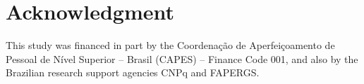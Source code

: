 \documentclass{article}
\begin{document}
\section{Acknowledgment}
\label{sec:ack}

This study was financed in part by the Coor\-de\-na\c{c}\~ao de
Aper\-fei\-\c{c}oa\-men\-to de Pes\-so\-al de N\'ivel Su\-pe\-ri\-or -- Brasil
(CAPES) -- Finance Code 001, and also by the Brazilian research support agencies
CNPq and FAPERGS.



\end{document}
